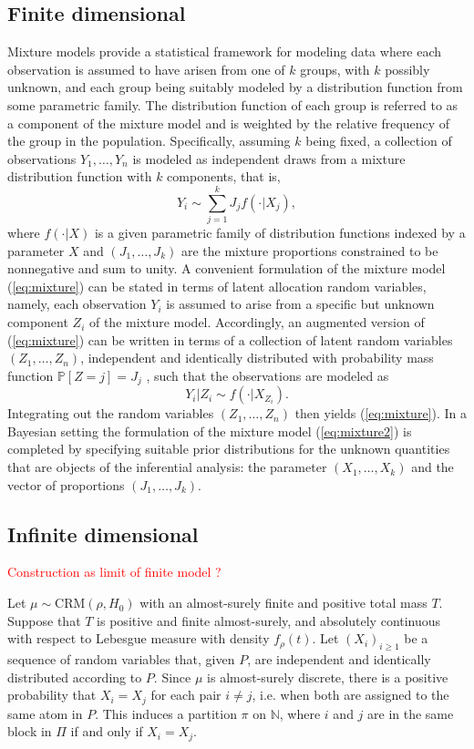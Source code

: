 \subsection{Finite dimensional}
Mixture models provide a statistical framework for modeling data where each observation is assumed to have arisen from one of $k$ groups, with $k$ possibly unknown, and each group being suitably modeled by a distribution function from some parametric family. The distribution function of each group is referred to as a component of the mixture model and is weighted by the relative frequency of the group in the population. Specifically, assuming $k$ being fixed, a collection of observations $Y_1,\dots,Y_n$ is modeled as independent draws from a mixture distribution function with $k$ components, that is,
\begin{equation} \label{eq:mixture}
Y_i \sim \sum_{j=1}^k{J_j f(\cdot|X_j)},
\end{equation}
where $f(\cdot|X)$ is a given parametric family of distribution functions indexed by a parameter $X$ and
$(J_1, \dots, J_k)$ are the mixture proportions constrained to be nonnegative and sum to unity. A convenient formulation of the mixture model (\ref{eq:mixture}) can be stated in terms of latent allocation random variables, namely, each observation $Y_i$ is assumed to arise from a specific but unknown component $Z_i$ of the mixture model. Accordingly, an augmented version of (\ref{eq:mixture}) can be written in terms of a collection of latent random variables $(Z_1, \dots , Z_n)$, independent and identically distributed with probability mass function $\mathbb{P}[Z = j] = J_j$ , such that the observations are modeled as
\begin{equation} \label{eq:mixture2}
Y_i|Z_i \sim f(\cdot|X_{Z_i}).
\end{equation}
Integrating out the random variables $(Z_1, \dots , Z_n)$ then yields (\ref{eq:mixture}). In a Bayesian setting the formulation of the mixture model (\ref{eq:mixture2}) is completed by specifying suitable prior distributions for the unknown quantities that are objects of the inferential analysis: the parameter $(X_1, \dots, X_k)$ and the vector of proportions $(J_1, \dots, J_k)$.

\subsection{Infinite dimensional}
\textcolor{red}{Construction as limit of finite model ?}

Let $\mu \sim \text{CRM}(\rho, H_0)$ with an almost-surely finite and positive total mass $T$. Suppose that $T$ is positive and finite almost-surely, and absolutely continuous with respect to Lebesgue measure with density $f_\rho(t)$.
Let $(X_i)_{i \ge 1}$ be a sequence of random variables that, given $P$, are independent and identically distributed according to $P$. Since $\mu$ is almost-surely discrete, there is a positive probability that $X_i = X_j$ for each pair $i \neq j$, i.e. when both are assigned to the same atom in $P$. This induces a partition $\pi$ on $\mathbb{N}$, where $i$ and $j$ are in the same block in $\Pi$ if and only if $X_i = X_j$. 

